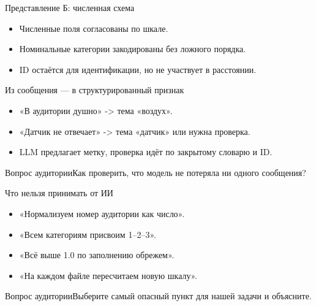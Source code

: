 \documentclass[aspectratio=169,10pt]{beamer}
\begin{document}
\begin{frame}[t]{Представление Б: численная схема}
\begin{itemize}
\item Численные поля согласованы по шкале.
\vspace{4pt}
\item Номинальные категории закодированы без ложного порядка.
\vspace{4pt}
\item ID остаётся для идентификации, но не участвует в расстоянии.
\vspace{4pt}
\end{itemize}
\end{frame}
\begin{frame}[t]{Из сообщения — в структурированный признак}
\begin{itemize}
\item «В аудитории душно» -> тема «воздух».
\vspace{4pt}
\item «Датчик не отвечает» -> тема «датчик» или нужна проверка.
\vspace{4pt}
\item LLM предлагает метку, проверка идёт по закрытому словарю и ID.
\vspace{4pt}
\end{itemize}
\vfill\begin{alertblock}{Вопрос аудитории}Как проверить, что модель не потеряла ни одного сообщения?\end{alertblock}
\end{frame}
\begin{frame}[t]{Что нельзя принимать от ИИ}
\begin{itemize}
\item «Нормализуем номер аудитории как число».
\vspace{4pt}
\item «Всем категориям присвоим 1–2–3».
\vspace{4pt}
\item «Всё выше 1.0 по заполнению обрежем».
\vspace{4pt}
\item «На каждом файле пересчитаем новую шкалу».
\vspace{4pt}
\end{itemize}
\vfill\begin{alertblock}{Вопрос аудитории}Выберите самый опасный пункт для нашей задачи и объясните.\end{alertblock}
\end{frame}
\end{document}
